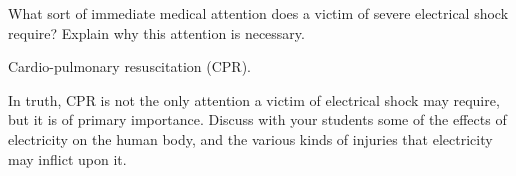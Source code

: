 

What sort of immediate medical attention does a victim of severe electrical shock require?  Explain why this attention is necessary.







Cardio-pulmonary resuscitation (CPR).







In truth, CPR is not the only attention a victim of electrical shock may require, but it is of primary importance.  Discuss with your students some of the effects of electricity on the human body, and the various kinds of injuries that electricity may inflict upon it.




